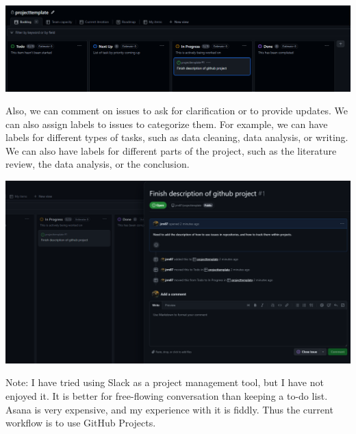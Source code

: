 \begin{center}
    \includegraphics[width=.8\textwidth]{./figures/workflow/gitproject_example2.png}
\end{center}

Also, we can comment on issues to ask for clarification or to provide updates.
We can also assign labels to issues to categorize them.
For example, we can have labels for different types of tasks, such as data cleaning, data analysis, or writing.
We can also have labels for different parts of the project, such as the literature review, the data analysis, or the conclusion.
\begin{center}
    \includegraphics[width=.8\textwidth]{./figures/workflow/gitproject_example3.png}
\end{center}


Note: I have tried using Slack as a project management tool, but I have not enjoyed it.
It is better for free-flowing conversation than keeping a to-do list. 
Asana is very expensive, and my experience with it is fiddly. Thus the current workflow is to use GitHub Projects.